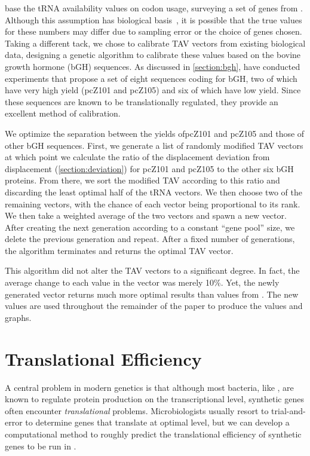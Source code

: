 \documentclass[12pt, draft]{article}
\numberwithin{equation}{section}
\begin{document}
\citeauthor{lalit:embs} base the tRNA availability values on codon usage, 
surveying a set of genes from \ecoli.
Although this assumption has biological basis~\cite{ikemura}, 
it is possible that the true values for these numbers may differ 
due to sampling error or the choice of genes chosen.
Taking a different tack, we chose to calibrate TAV vectors from
existing biological data, designing a genetic algorithm to calibrate
these values based on the bovine growth hormone (bGH) sequences.
As discussed in \autoref{section:bgh}, \citet{schoner:bgh}
have conducted experiments that propose a set of eight sequences coding for bGH,
two of which have very high yield (pcZ101 and pcZ105) and six of which have low yield.
Since these sequences are known to be translationally regulated, they
provide an excellent method of calibration.

We optimize the separation between the yields ofpcZ101 and pcZ105 and those of other bGH sequences.  
First, we generate a list of randomly modified TAV vectors at which
point we calculate the ratio of the displacement deviation from
displacement (\autoref{section:deviation}) for pcZ101 and pcZ105 to the other
six bGH proteins. From there, we sort the modified TAV according to
this ratio and discarding the least optimal half of the tRNA
vectors. We then choose two of the remaining vectors, with the chance
of each vector being proportional to its rank.  We then take a
weighted average of the two vectors and spawn a new vector.  After
creating the next generation according to a constant ``gene pool''
size, we delete the previous generation and repeat. After a fixed
number of generations, the algorithm terminates and returns the
optimal TAV vector.

This algorithm did not alter the TAV vectors to a significant degree.
In fact, the average change to each value in the vector was merely
10\%.  Yet, the newly generated vector returns much more optimal
results than values from \citeauthor{lalit:embs}.  The new values
are used throughout the remainder of the paper to produce the 
values and graphs.

\section{Translational Efficiency}


A central problem in modern genetics is that
although most bacteria, like \ecoli, are known to regulate protein production
on the transcriptional level, synthetic genes often encounter \emph{translational}
problems.  Microbiologists usually resort to trial-and-error to determine genes
that translate at optimal level, but we can develop a computational method
to roughly predict the translational efficiency of synthetic genes to
be run in \ecoli.
\end{document}
